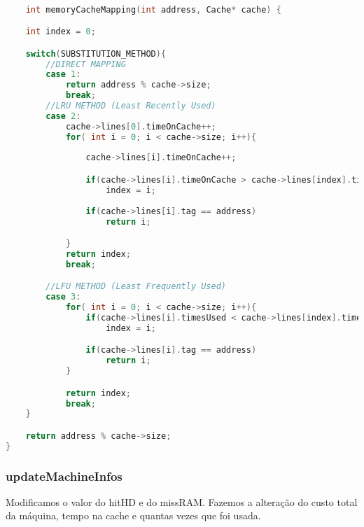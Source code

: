 \documentclass{article}
\begin{document}
\begin{lstlisting}[caption={Função memoryCacheMapping},label={lst:cod6},language=C]

    int memoryCacheMapping(int address, Cache* cache) {

    int index = 0;

    switch(SUBSTITUTION_METHOD){
        //DIRECT MAPPING
        case 1:
            return address % cache->size;
            break;
        //LRU METHOD (Least Recently Used)
        case 2:
            cache->lines[0].timeOnCache++;
            for( int i = 0; i < cache->size; i++){
                
                cache->lines[i].timeOnCache++;

                if(cache->lines[i].timeOnCache > cache->lines[index].timeOnCache)
                    index = i;
                
                if(cache->lines[i].tag == address)
                    return i;

            }
            return index;
            break;

        //LFU METHOD (Least Frequently Used)
        case 3:
            for( int i = 0; i < cache->size; i++){
                if(cache->lines[i].timesUsed < cache->lines[index].timesUsed)
                    index = i;

                if(cache->lines[i].tag == address)
                    return i;
            }

            return index;
            break;
    }

    return address % cache->size;
}

\end{lstlisting}

\subsubsection{updateMachineInfos}

Modificamos o valor do hitHD e do missRAM. Fazemos a alteração do custo total da máquina, tempo na cache e quantas vezes que foi usada.
\end{document}
